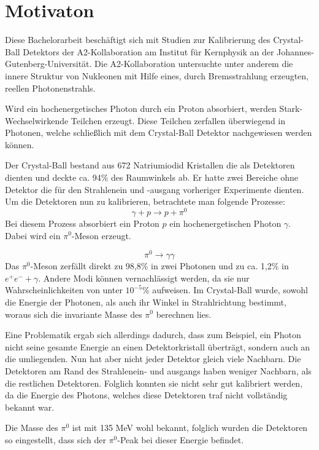 \documentclass[a4paper,11pt,oneside,final,german,openbib,pdftex]{scrbook}
\begin{document}
\section{Motivaton}
{
	Diese Bachelorarbeit beschäftigt sich mit Studien zur Kalibrierung des Crystal-Ball Detektors der A2-Kollaboration am Institut für Kernphysik an der Johannes-Gutenberg-Universität.
	Die A2-Kollaboration untersuchte unter anderem die innere Struktur von Nukleonen mit Hilfe eines, durch Bremsstrahlung erzeugten, reellen Photonenstrahls. 
	
	Wird ein hochenergetisches Photon durch ein Proton absorbiert, werden Stark-Wechselwirkende Teilchen erzeugt. Diese Teilchen zerfallen überwiegend in Photonen, welche schließlich mit dem Crystal-Ball Detektor nachgewiesen werden können. 
	
	Der Crystal-Ball bestand aus 672 Natriumiodid Kristallen die als Detektoren dienten und deckte ca. 94\% des Raumwinkels ab.
	Er hatte zwei Bereiche ohne Detektor die für den Strahlenein und -ausgang vorheriger Experimente dienten.
	Um die Detektoren nun zu kalibrieren, betrachtete man folgende Prozesse:
\begin{equation}
	\gamma + p \rightarrow p + \pi^0
	\label{eq.gammascattering}
\end{equation} 
Bei diesem Prozess absorbiert ein Proton $p$ ein hochenergetischen Photon $\gamma$. Dabei wird ein $\pi^0$-Meson erzeugt.

	\begin{equation}
		\pi^0\rightarrow \gamma \gamma
		\label{eq.pi0decay}
	\end{equation}
	Das $\pi^0$-Meson zerfällt direkt zu 98,8\% in zwei Photonen und zu ca. 1,2\% in $e^+e^-+\gamma$. Andere Modi können vernachlässigt werden, da sie nur Wahrscheinlichkeiten von unter $10^{-5}$\% aufweisen. Im Crystal-Ball wurde, sowohl die Energie der Photonen, als auch ihr Winkel in Strahlrichtung bestimmt, woraus sich die invariante Masse des $\pi^0$ berechnen lies. 
	
	Eine Problematik ergab sich allerdings dadurch, dass zum Beispiel, ein Photon nicht seine gesamte Energie an einen Detektorkristall überträgt, sondern auch an die umliegenden. Nun hat aber nicht jeder Detektor gleich viele Nachbarn. Die Detektoren am Rand des Strahlenein- und ausgangs haben weniger Nachbarn, als die restlichen Detektoren. Folglich konnten sie nicht sehr gut kalibriert werden, da die Energie des Photons, welches diese Detektoren traf nicht vollständig bekannt war.
	
	Die Masse des $\pi^0$ ist mit 135 MeV wohl bekannt, folglich wurden die Detektoren so eingestellt, dass sich der $\pi^0$-Peak bei dieser Energie befindet. 
	\newline	 
	
}
\end{document}
